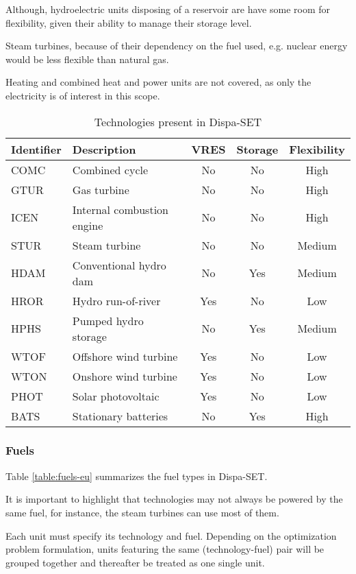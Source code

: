 Although, hydroelectric units disposing of a reservoir are have some room for flexibility, given their ability to manage their storage level.

Steam turbines, because of their dependency on the fuel used, e.g. nuclear energy would be less flexible than natural gas.

Heating and combined heat and power units are not covered, as only the electricity is of interest in this scope.

\begin{table}
    \centering
    \begin{tabular}{|l l c c c|}
        \hline
		Identifier & Description & VRES & Storage & Flexibility\\
		\hline
		COMC & Combined cycle             & No  & No  & High\\
		GTUR & Gas turbine                & No  & No  & High\\
		ICEN & Internal combustion engine & No  & No  & High\\
		STUR & Steam turbine              & No  & No  & Medium\\
		HDAM & Conventional hydro dam     & No  & Yes & Medium \\
		HROR & Hydro run-of-river         & Yes & No  & Low\\
		HPHS & Pumped hydro storage       & No  & Yes & Medium\\
		WTOF & Offshore wind turbine      & Yes & No  & Low\\
		WTON & Onshore wind turbine       & Yes & No  & Low\\
		PHOT & Solar photovoltaic         & Yes & No  & Low\\
		BATS & Stationary batteries       & No  & Yes & High\\
		\hline
    \end{tabular}
    \caption{Technologies present in Dispa-SET}
    \label{table:technologies-eu}
\end{table}


\subsubsection{Fuels}

Table \ref{table:fuels-eu} summarizes the fuel types in Dispa-SET.

It is important to highlight that technologies may not always be powered by the same fuel, for instance, the steam turbines can use most of them.

Each unit must specify its technology and fuel. Depending on the optimization problem formulation, units featuring the same (technology-fuel) pair will be grouped together and thereafter be treated as one single unit.

